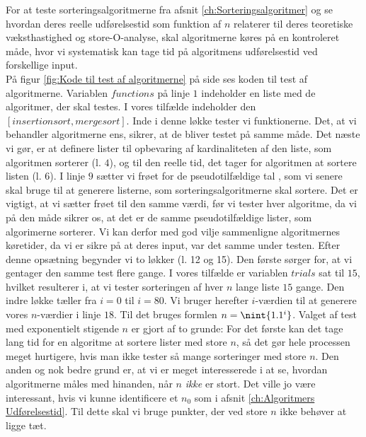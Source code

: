 For at teste sorteringsalgoritmerne fra afsnit \ref{ch:Sorteringsalgoritmer} og se hvordan deres reelle udførelsestid som funktion af $n$ relaterer til deres teoretiske væksthastighed og store-O-analyse, skal algoritmerne køres på en kontroleret måde, hvor vi systematisk kan tage tid på algoritmens udførelsestid ved forskellige input.\\

På figur \ref{fig:Kode til test af algoritmerne} på side \pageref{fig:Kode til test af algoritmerne} ses koden til test af algoritmerne. Variablen $functions$ på linje $1$ indeholder en liste med de algoritmer, der skal testes. I vores tilfælde indeholder den $[insertionsort,mergesort]$. Inde i denne løkke tester vi funktionerne. Det, at vi behandler algoritmerne ens, sikrer, at de bliver testet på samme måde. Det næste vi gør, er at definere lister til opbevaring af kardinaliteten af den liste, som algoritmen sorterer (l. $4$), og til den reelle tid, det tager for algoritmen at sortere listen (l. 6).  I linje $9$ sætter vi frøet for de pseudotilfældige tal \cite{python-random}, som vi senere skal bruge til at generere listerne, som sorteringsalgoritmerne skal sortere. Det er vigtigt, at vi sætter frøet til den samme værdi, før vi tester hver algoritme, da vi på den måde sikrer os, at det er de samme pseudotilfældige lister, som algorimerne sorterer. Vi kan derfor med god vilje sammenligne algoritmernes køretider, da vi er sikre på at deres input, var det samme under testen. Efter denne opsætning begynder vi to løkker (l. 12 og 15). Den første sørger for, at vi gentager den samme test flere gange. I vores tilfælde er variablen $trials$ sat til $15$, hvilket resulterer i, at vi tester sorteringen af hver $n$ lange liste $15$ gange. Den indre løkke tæller fra $i=0$ til $i=80$. Vi bruger herefter $i$-værdien til at generere vores $n$-værdier i linje $18$. Til det bruges formlen $n=\nint{1.1^i}$. Valget af test med exponentielt stigende $n$ er gjort af to grunde: For det første kan det tage lang tid for en algoritme at sortere lister med store $n$, så det gør hele processen meget hurtigere, hvis man ikke tester så mange sorteringer med store $n$. Den anden og nok bedre grund er, at vi er meget interesserede i at se, hvordan algoritmerne måles med hinanden, når $n$ \emph{ikke} er stort. Det ville jo være interessant, hvis vi kunne identificere et $n_0$ som i afsnit \ref{ch:Algoritmers Udførelsestid}. Til dette skal vi bruge punkter, der ved store $n$ ikke behøver at ligge tæt.\\

